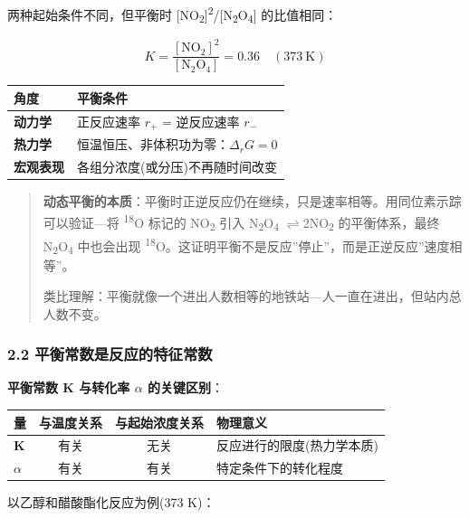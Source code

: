 \documentclass[a4paper,11pt]{ctexart}
\newcounter{none}
\newcommand{\箭}{\ensuremath{\rightarrow}}
\newcommand{\左箭}{\ensuremath{\leftarrow}}
\newcommand{\上箭}{\ensuremath{\uparrow}}
\newcommand{\下箭}{\ensuremath{\downarrow}}
\newcommand{\衡}{\ensuremath{\rightleftharpoons}}
\newcommand{\双箭}{\ensuremath{\leftrightarrow}}
\newcommand{\约等于}{\ensuremath{\approx}}
\newcommand{\小于等于}{\ensuremath{\leq}}
\newcommand{\大于等于}{\ensuremath{\geq}}
\newcommand{\不等于}{\ensuremath{\neq}}
\newcommand{\西格马}{\ensuremath{\sigma}}
\newcommand{\派}{\ensuremath{\pi}}
\begin{document}
两种起始条件不同，但平衡时 {[}NO\textsubscript{2}{]}\textsuperscript{2}/{[}N\textsubscript{2}O\textsubscript{4}{]} 的比值相同：

\[
K = \frac{[\mathrm{NO_2}]^2}{[\mathrm{N_2O_4}]} = 0.36 \quad (373\ \mathrm{K})
\]

{\def\LTcaptype{none} %
\begin{longtable}[]{@{}ll@{}}
\toprule\noalign{}
角度 & 平衡条件 \\
\midrule\noalign{}
\endhead
\bottomrule\noalign{}
\endlastfoot
\textbf{动力学} & 正反应速率 \(r_+\) = 逆反应速率 \(r_-\) \\
\textbf{热力学} & 恒温恒压、非体积功为零：\(\Delta_r G = 0\) \\
\textbf{宏观表现} & 各组分浓度(或分压)不再随时间改变 \\
\end{longtable}
}

\begin{quote}
\textbf{动态平衡的本质}：平衡时正逆反应仍在继续，只是速率相等。用同位素示踪可以验证---将 \textsuperscript{18}O 标记的 NO\textsubscript{2} 引入 N\textsubscript{2}O\textsubscript{4} \衡 2NO\textsubscript{2} 的平衡体系，最终 N\textsubscript{2}O\textsubscript{4} 中也会出现 \textsuperscript{18}O。这证明平衡不是反应''停止''，而是正逆反应''速度相等''。

类比理解：平衡就像一个进出人数相等的地铁站---人一直在进出，但站内总人数不变。
\end{quote}

\subsubsection{2.2 平衡常数是反应的特征常数}\label{ux5e73ux8861ux5e38ux6570ux662fux53cdux5e94ux7684ux7279ux5f81ux5e38ux6570}

\textbf{平衡常数 K 与转化率 \(\alpha\) 的关键区别}：

{\def\LTcaptype{none} %
\begin{longtable}[]{@{}lccl@{}}
\toprule\noalign{}
量 & 与温度关系 & 与起始浓度关系 & 物理意义 \\
\midrule\noalign{}
\endhead
\bottomrule\noalign{}
\endlastfoot
\textbf{K} & 有关 & 无关 & 反应进行的限度(热力学本质) \\
\textbf{\(\alpha\)} & 有关 & 有关 & 特定条件下的转化程度 \\
\end{longtable}
}

以乙醇和醋酸酯化反应为例(373 K)：
\end{document}
